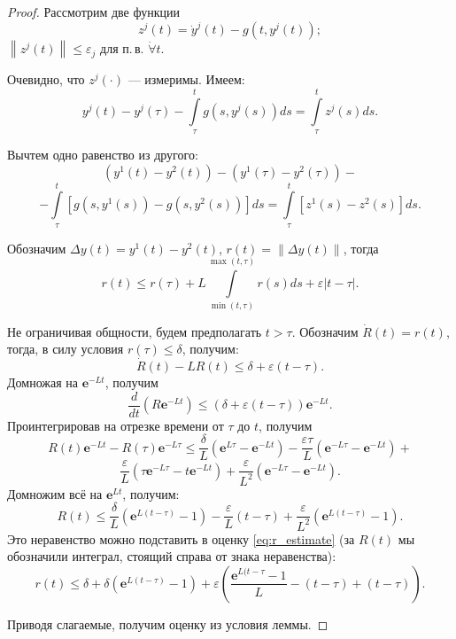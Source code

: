 \documentclass[12pt, a4paper]{article}
\theoremstyle{rusdef}
\newcommand\abs[1]{\left\lvert #1 \right\rvert} %
\newcommand{\e}{\mathbf{e}}
\newcommand{\norm}[1]{\left\lVert #1 \right\rVert} %
\begin{document}
\begin{proof}
Рассмотрим две функции
$$
z^j (t) = \dot{y}^j (t) - g(t, y^j (t));
$$
$\norm{z^j (t)} \leqslant \varepsilon_j$ для п.\,в. $\dot{\forall} t$.

Очевидно, что $z^j(\cdot)$ --- измеримы. Имеем:
$$
y^j (t) - y^j(\tau) - \int\limits_{\tau}^{t} g(s, y^j(s)) ds = \int\limits_{\tau}^{t} z^j (s) ds.
$$

Вычтем одно равенство из другого:
$$
\left( y^1(t) - y^2(t) \right) - \left(y^1(\tau) - y^2(\tau)\right) -
$$
$$
- \int\limits_{\tau}^{t}\left[ g(s, y^1(s)) - g(s, y^2(s)) \right] ds = \int\limits_{\tau}^{t} \left[ z^1(s) - z^2(s) \right] ds.
$$

Обозначим $\Delta y(t) = y^1(t) - y^2(t)$, $r(t) = \norm{\Delta y(t)}$, тогда
\begin{equation}\label{eq:r_estimate}
r(t) \leqslant r(\tau) + L \int\limits_{\min(t,\tau)}^{\max(t,\tau)} r(s) ds + \varepsilon\abs{t - \tau}.
\end{equation}

Не ограничивая общности, будем предполагать $t > \tau$. Обозначим $\dot{R}(t) = r(t)$, тогда, в силу условия $r(\tau) \leqslant \delta$, получим:
$$
\dot{R}(t) - LR(t) \leqslant \delta + \varepsilon (t - \tau).
$$
Домножая на $\e^{-Lt}$, получим
$$
\dfrac{d}{dt} \left( R \e^{-Lt} \right) \leqslant (\delta + \varepsilon(t - \tau))\e^{-Lt}.
$$
Проинтегрировав на отрезке времени от $\tau$ до $t$, получим
$$
R(t)\e^{-Lt} - R(\tau) \e^{-L\tau} \leqslant \dfrac{\delta}{L} \left( \e^{L\tau} - \e^{-Lt}\right) - \dfrac{\varepsilon \tau}{L} \left( \e^{-L\tau} - \e^{-Lt} \right) +
$$
$$
\dfrac{\varepsilon}{L} \left( \tau \e^{-L\tau} - t\e^{-Lt} \right) + \dfrac{\varepsilon}{L^2} \left( \e^{-L\tau} - \e^{-Lt} \right).
$$
Домножим всё на $\e^{Lt}$, получим:
$$
R(t) \leqslant \dfrac{\delta}{L} \left( \e^{L(t - \tau)} - 1 \right) - \dfrac{\varepsilon}{L}(t - \tau) + \dfrac{\varepsilon}{L^2} \left( \e^{L(t - \tau)} - 1 \right).
$$
Это неравенство можно подставить в оценку \eqref{eq:r_estimate} (за $R(t)$ мы обозначили интеграл, стоящий справа от знака неравенства):
$$
r(t) \leqslant \delta + \delta \left( \e^{L(t - \tau)} - 1 \right) + \varepsilon \left( \dfrac{\e^{L(t - \tau} - 1}{L} - (t - \tau) + (t - \tau) \right).
$$

Приводя слагаемые, получим оценку из условия леммы.
\end{proof}
\end{document}
